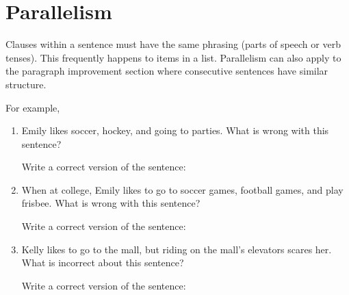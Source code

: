 \section{Parallelism}

Clauses within a sentence must have the same phrasing (parts of speech or verb tenses). This
frequently happens to items in a list. Parallelism can also apply to the paragraph improvement
section where consecutive sentences have similar structure.

\bigskip
For example,
\begin{enumerate}

\item Emily likes soccer, hockey, and going to parties. What is wrong with this sentence? 

\hrulefill

Write a correct version of the sentence:

\hrulefill
\item When at college, Emily likes to go to soccer games, football games, and play frisbee. What
is wrong with this sentence?

\hrulefill

Write a correct version of the sentence:

\hrulefill
\item Kelly likes to go to the mall, but riding on the mall's elevators scares her. What is incorrect
about this sentence?

\hrulefill

Write a correct version of the sentence:

\hrulefill
\end{enumerate}
